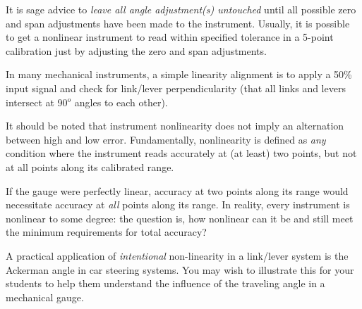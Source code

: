 It is sage advice to {\it leave all angle adjustment(s) untouched} until all possible zero and span adjustments have been made to the instrument.  Usually, it is possible to get a nonlinear instrument to read within specified tolerance in a 5-point calibration just by adjusting the zero and span adjustments.

In many mechanical instruments, a simple linearity alignment is to apply a 50\% input signal and check for link/lever perpendicularity (that all links and levers intersect at 90$^{o}$ angles to each other).







It should be noted that instrument nonlinearity does not imply an alternation between high and low error.  Fundamentally, nonlinearity is defined as {\it any} condition where the instrument reads accurately at (at least) two points, but not at all points along its calibrated range.

If the gauge were perfectly linear, accuracy at two points along its range would necessitate accuracy at {\it all} points along its range.  In reality, every instrument is nonlinear to some degree: the question is, how nonlinear can it be and still meet the minimum requirements for total accuracy?

\vskip 10pt

A practical application of {\it intentional} non-linearity in a link/lever system is the Ackerman angle in car steering systems.  You may wish to illustrate this for your students to help them understand the influence of the traveling angle in a mechanical gauge.




